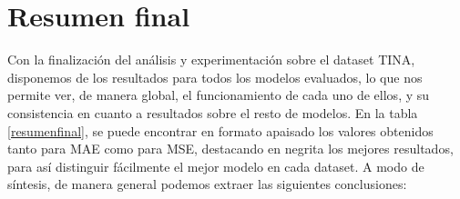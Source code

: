 \section{Resumen final}

Con la finalización del análisis y experimentación sobre el dataset TINA, disponemos de los resultados para todos los modelos evaluados, lo que nos permite ver, de manera global, el funcionamiento de cada uno de ellos, y su consistencia en cuanto a resultados sobre el resto de modelos. En la tabla \ref{resumenfinal}, se puede encontrar en formato apaisado los valores obtenidos tanto para MAE como para MSE, destacando en negrita los mejores resultados, para así distinguir fácilmente el mejor modelo en cada dataset. A modo de síntesis, de manera general podemos extraer las siguientes conclusiones:

